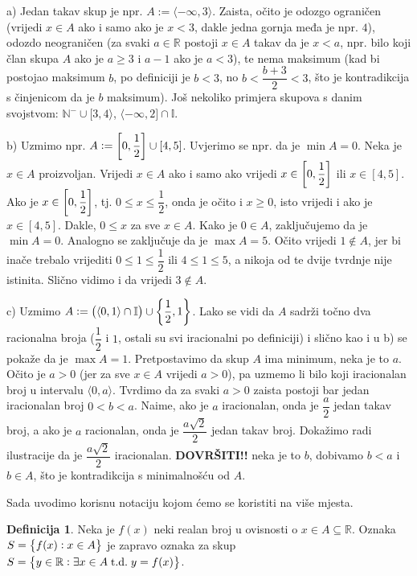 \documentclass{book}
\let\originalleft\left
\let\originalright\right
\renewcommand{\left}{\mathopen{}\mathclose\bgroup\originalleft}
\renewcommand{\right}{\aftergroup\egroup\originalright}
\renewenvironment{proof}{%
    \vspace{-\parskip}\begin{oldproof}%
    }{%
    \end{oldproof}%
}
\theoremstyle{definition}
\theoremstyle{definition}
\newtheorem{definition}{Definicija}
\theoremstyle{remark}
\begin{document}
\begin{proof}[Rješenje]
a) Jedan takav skup je npr. $A:=\langle -\infty, 3\rangle$. Zaista, očito je odozgo ograničen (vrijedi $x\in A$ ako i samo ako je $x<3$, dakle jedna gornja međa je npr. $4$), odozdo neograničen (za svaki $a\in \mathbb{R}$ postoji $x\in A$ takav da je $x<a$, npr. bilo koji član skupa $A$ ako je $a\geq 3$ i $a-1$ ako je $a<3$), te nema maksimum (kad bi postojao maksimum $b$, po definiciji je $b<3$, no $b<\dfrac{b+3}{2}<3$, što je kontradikcija s činjenicom da je $b$ maksimum). Još nekoliko primjera skupova s danim svojstvom: $\mathbb{N}^-\cup [3, 4\rangle$, $\langle -\infty, 2]\cap \mathbb{I}$.

b) Uzmimo npr. $A:=\left[0,\dfrac{1}{2}\right]\cup \left[4, 5\right]$. Uvjerimo se npr. da je $\min{A}=0$. Neka je $x\in A$ proizvoljan. Vrijedi $x\in A$ ako i samo ako vrijedi $x\in \left[0,\dfrac{1}{2}\right]$ ili $x\in [4, 5]$. Ako je $x\in \left[0,\dfrac{1}{2}\right]$, tj. $0\leq x\leq \dfrac{1}{2}$, onda je očito i $x\geq 0$, isto vrijedi i ako je $x\in [4, 5]$. Dakle, $0\leq x$ za sve $x\in A$. Kako je $0\in A$, zaključujemo da je $\min{A}=0$. Analogno se zaključuje da je $\max{A}=5$. Očito vrijedi $1\notin A$, jer bi inače trebalo vrijediti $0\leq 1\leq \dfrac{1}{2}$ ili $4\leq 1\leq 5$, a nikoja od te dvije tvrdnje nije istinita. Slično vidimo i da vrijedi $3\notin A$.

c) Uzmimo $A:=\left(\langle 0, 1\rangle\cap \mathbb{I}\right)\cup \left\{\dfrac{1}{2}, 1\right\}$. Lako se vidi da $A$ sadrži točno dva racionalna broja ($\dfrac{1}{2}$ i $1$, ostali su svi iracionalni po definiciji) i slično kao i u b) se pokaže da je $\max{A}=1$. Pretpostavimo da skup $A$ ima minimum, neka je to $a$. Očito je $a>0$ (jer za sve $x\in A$ vrijedi $a>0$), pa uzmemo li bilo koji iracionalan broj u intervalu $\langle 0, a\rangle$. Tvrdimo da za svaki $a>0$ zaista postoji bar jedan iracionalan broj $0<b<a$. Naime, ako je $a$ iracionalan, onda je $\dfrac{a}{2}$ jedan takav broj, a ako je $a$ racionalan, onda je $\dfrac{a\sqrt{2}}{2}$ jedan takav broj. Dokažimo radi ilustracije da je $\dfrac{a\sqrt{2}}{2}$ iracionalan. \textbf{DOVRŠITI!!} neka je to $b$, dobivamo $b<a$ i $b\in A$, što je kontradikcija s minimalnošću od $A$.
\end{proof}
Sada uvodimo korisnu notaciju kojom ćemo se koristiti na više mjesta.

\begin{definition}
Neka je $f(x)$ neki realan broj u ovisnosti o $x\in A\subseteq \mathbb{R}$. Oznaka $S=\left\{f(x) : x\in A\right\}$ je zapravo oznaka za skup $S=\left\{y\in \mathbb{R} : \exists x\in A \;\mathrm{t.d.}\; y=f(x)\right\}$.
\end{definition}
\end{document}
